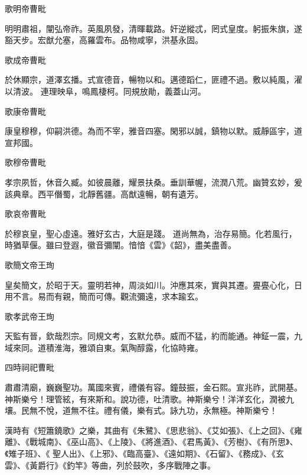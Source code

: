 \begin{pinyinscope}
 歌明帝曹毗



 明明肅祖，闡弘帝祚。英風夙發，清暉載路。奸逆縱忒，罔式皇度。躬振朱旗，遂豁天步。宏猷允塞，高羅雲布。品物咸寧，洪基永固。



 歌成帝曹毗



 於休顯宗，道澤玄播。式宣德音，暢物以和。邁德蹈仁，匪禮不過。敷以純風，濯以清波。
 連理映阜，鳴鳳棲柯。同規放勛，義蓋山河。



 歌康帝曹毗



 康皇穆穆，仰嗣洪德。為而不宰，雅音四塞。閑邪以誠，鎮物以默。威靜區宇，道宣邦國。



 歌穆帝曹毗



 孝宗夙哲，休音久臧。如彼晨離，耀景扶桑。垂訓華幄，流潤八荒。幽贊玄妙，爰該典章。西平僭蜀，北靜舊疆。高猷遠暢，朝有遺芳。



 歌哀帝曹毗



 於穆哀皇，聖心虛遠。雅好玄古，大庭是踐。
 道尚無為，治存易簡。化若風行，時猶草偃。雖曰登遐，徽音彌闡。愔愔《雲》《韶》，盡美盡善。



 歌簡文帝王珣



 皇矣簡文，於昭于天。靈明若神，周淡如川。沖應其來，實與其遷。亹亹心化，日用不言。易而有親，簡而可傳。觀流彌遠，求本踰玄。



 歌孝武帝王珣



 天監有晉，欽哉烈宗。同規文考，玄默允恭。威而不猛，約而能通。神鉦一震，九域來同。道積淮海，雅頌自東。氣陶醇露，化協時雍。



 四時祠祀曹毗



 肅肅清廟，巍巍聖功。萬國來賓，禮儀有容。鐘鼓振，金石熙。宣兆祚，武開基。神斯樂兮！理管絃，有來斯和。說功德，吐清歌。神斯樂兮！洋洋玄化，潤被九壤。民無不悅，道無不往。禮有儀，樂有式。詠九功，永無極。神斯樂兮！



 漢時有《短簫鐃歌》之樂，其曲有《朱鷺》、《思悲翁》、《艾如張》、《上之回》、《雍離》、《戰城南》、《巫山高》、《上陵》、《將進酒》、《君馬黃》、《芳樹》、《有所思》、《雉子班》、《
 聖人出》、《上邪》、《臨高臺》、《遠如期》、《石留》、《務成》、《玄雲》、《黃爵行》《釣竿》等曲，列於鼓吹，多序戰陣之事。




\end{pinyinscope}
